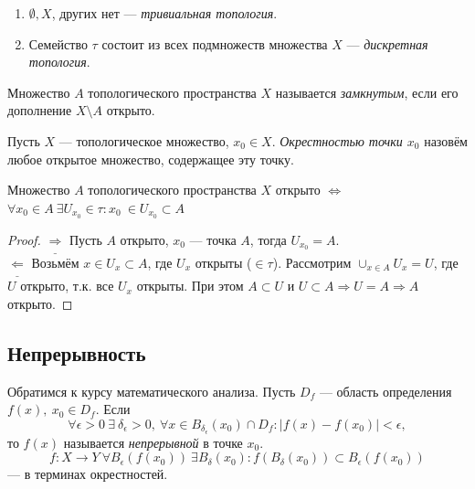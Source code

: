 \begin{example}
    \begin{enumerate}
        \item $\emptyset, X$, других нет — \textit{тривиальная топология}.
        \item Семейство $\tau$ состоит из всех подмножеств множества $X$ — \textit{дискретная топология}.
    \end{enumerate}
\end{example}

\begin{definition}
    Множество $A$ топологического пространства $X$ называется \textit{замкнутым}, если его дополнение $X \setminus A$ открыто.
\end{definition}

\begin{definition}
    Пусть $X$ — топологическое множество, $x_0 \in X$. \textit{Окрестностью точки $x_0$} назовём любое открытое множество, содержащее эту точку.
\end{definition}

\begin{statement}
    Множество $A$ топологического пространства $X$ открыто $\Leftrightarrow$ $\forall x_0 \in A \ \exists U_{x_0} \in \tau: x_0 \ \in U_{x_0} \subset A$
\end{statement}
\begin{proof}
    $\underline{\Longrightarrow}$ Пусть $A$ открыто, $x_0$ — точка $A$, тогда $U_{x_0} = A$. \\
    $\underline{\Longleftarrow}$ Возьмём $x \in U_x \subset A$, где $U_x$ открыты ($\in \tau$).
    Рассмотрим $\cup_{x \in A} U_x = U$, где $U$ открыто, т.к. все $U_x$ открыты.
    При этом $A \subset U$ и $U \subset A \Rightarrow U = A \Rightarrow A$ открыто.
\end{proof}

\subsection{Непрерывность}
\begin{definition} Обратимся к курсу математического анализа.
    Пусть $D_f$ — область определения $f(x),\ x_0\in D_f$. Если 
    \[\forall \epsilon>0\ \exists\ \delta_{\epsilon}>0,\ \forall x\in B_{\delta_{\epsilon}}(x_0)\cap D_f: |f(x)-f(x_0)|<\epsilon,\] 
    то $f(x)$ называется \textit{непрерывной} в точке $x_0$. \\
    $$f: X \to Y \ \forall B_{\epsilon}(f(x_0)) \ \exists B_{\delta}(x_0): f(B_{\delta}(x_0)) \subset B_{\epsilon}(f(x_0))$$ — в терминах окрестностей.
\end{definition}

